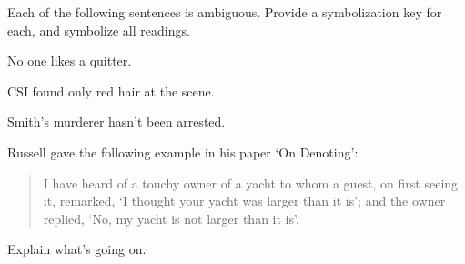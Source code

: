 \practiceproblems
\problempart
Each of the following sentences is ambiguous. Provide a symbolization key for each, and symbolize all readings.
\begin{compactlist}
	\item No one likes a quitter.
	\item CSI found only red hair at the scene.
	\item Smith's murderer hasn't been arrested.
\end{compactlist}

\problempart
Russell gave the following example in his paper `On Denoting':
\begin{quote}
	I have heard of a touchy owner of a yacht to whom a guest, on first seeing it, remarked, `I thought your yacht was larger than it is'; and the owner replied, `No, my yacht is not larger than it is'.
\end{quote}
Explain what's going on.
